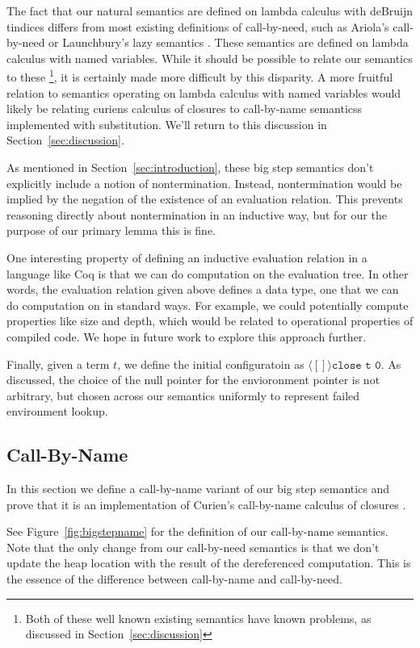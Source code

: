 The fact that our natural semantics are defined on lambda calculus with deBruijn
tindices differs from most existing definitions of call-by-need, such as
Ariola's call-by-need \cite{ariola1995call} or Launchbury's lazy semantics
\cite{launchburynatural}. These semantics are defined on lambda calculus with named
variables. While it should be possible to relate our semantics to these
\footnote{Both of these well known existing semantics have known problems, as
discussed in Section~\ref{sec:discussion}}, it is certainly made more difficult by
this disparity. A more fruitful relation to semantics operating on lambda
calculus with named variables would likely be relating curiens calculus of
closures to call-by-name semanticss implemented with substitution. We'll return
to this discussion in Section~\ref{sec:discussion}.

As mentioned in Section~\ref{sec:introduction}, these big step semantics don't explicitly
include a notion of nontermination. Instead, nontermination would be implied by
the negation of the existence of an evaluation relation. This prevents reasoning
directly about nontermination in an inductive way, but for our the purpose of
our primary lemma this is fine. 

One interesting property of defining an inductive evaluation relation in a
language like Coq is that we can do computation on the evaluation tree. In other
words, the evaluation relation given above defines a data type, one that we can
do computation on in standard ways. For example, we could potentially compute
properties like size and depth, which would be related to operational properties
of compiled code. We hope in future work to explore this approach further.

Finally, given a term $t$, we define the initial configuratoin as $\langle [] \rangle
\texttt{close t 0}$. As discussed, the choice of the null pointer for the envioronment
pointer is not arbitrary, but chosen across our semantics uniformly to represent
failed environment lookup. 

\subsection{Call-By-Name}

In this section we define a call-by-name variant of our big step semantics and
prove that it is an implementation of Curien's call-by-name calculus of
closures \cite{curien1991abstract}. 

See Figure~\ref{fig:bigstepname} for the definition of our call-by-name
semantics. Note that the only change from our call-by-need semantics is that we
don't update the heap location with the result of the dereferenced computation.
This is the essence of the difference between call-by-name and call-by-need.

